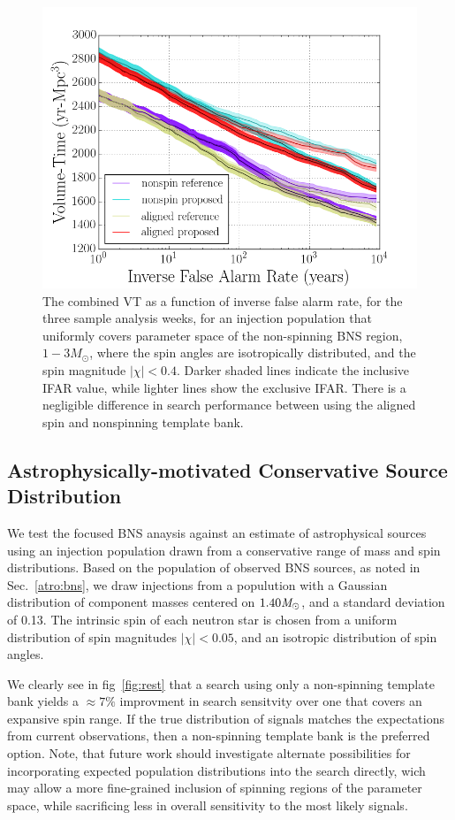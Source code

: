 \begin{figure}
\centering
\includegraphics[width=1.0\textwidth]{papers/bns_o1_dev/figures/prec_combined.png}
\caption{\label{fig:prec} 
The combined VT as a function of inverse false alarm rate, for the
three sample analysis weeks, for an injection population that uniformly covers parameter space of the non-spinning BNS region, $1- 3M_\odot$, where
the spin angles are isotropically distributed, and the spin magnitude $|\chi| < 0.4$. Darker shaded lines indicate the inclusive IFAR value, while lighter lines show the exclusive IFAR. There is a negligible difference in search performance between using the aligned spin and nonspinning template bank.
}
\end{figure}

\subsection{Astrophysically-motivated Conservative Source Distribution}

We test the focused BNS anaysis against an estimate of astrophysical sources using an injection population drawn from a conservative range of mass and spin distributions. Based on the population of observed BNS sources, as noted in Sec.~\ref{atro:bns}, we draw injections from a populution with a Gaussian distribution of component masses centered on $1.40 \mathit{M}_\odot$, and a standard deviation of 0.13. The intrinsic spin of each neutron star is chosen from a uniform distribution of spin magnitudes $|\chi| < 0.05$, and an isotropic distribution of spin angles. 

We clearly see in fig~\ref{fig:rest} that a search using only a non-spinning template bank yields a $\approx{7\%}$ improvment in search sensitvity over one that covers an expansive spin range. If the true distribution of signals matches the expectations from current observations, then a non-spinning template bank is the preferred option. Note, that future work should investigate alternate possibilities for incorporating expected population distributions into the search directly, wich may allow a more fine-grained inclusion of spinning regions of the parameter space, while sacrificing less in overall sensitivity to the most likely signals.

